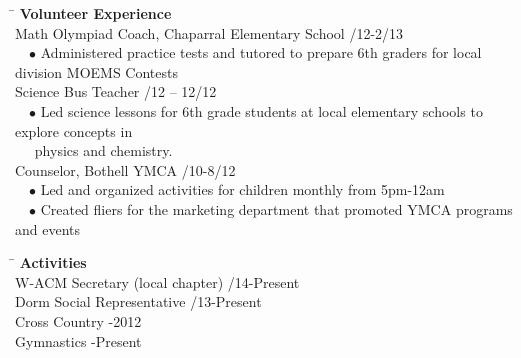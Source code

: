 \documentclass[11.5pt]{article}
\newcommand{\sectionNL}{\\[2pt]}
\newcommand{\customtab}{$\hspace{10pt}\bullet\hspace{2pt}$}
\newcommand{\customtabinline}{$\hspace{17pt}$}
\begin{document}
\begin{tabbing} 
\hspace*{6.5in}\= \kill
{\large \textbf{Volunteer Experience} } \> \sectionNL
Math Olympiad Coach, Chaparral Elementary School /12-2/13 \\
\customtab Administered practice tests and tutored to prepare 6th graders for local division MOEMS Contests \\
\newline
Science Bus Teacher /12 – 12/12 \\
\customtab Led science lessons for 6th grade students at local elementary schools to explore concepts in \\ \customtabinline physics and chemistry.  \\

Counselor, Bothell YMCA /10-8/12 \\
\customtab Led and organized activities for children monthly from 5pm-12am \\
\customtab Created fliers for the marketing department that promoted YMCA programs and events
\end{tabbing}

\begin{tabbing}
\hspace*{6.5in}\= \kill
{\large \textbf{Activities} } \> \sectionNL
W-ACM Secretary (local chapter) /14-Present \\
Dorm Social Representative /13-Present \\
Cross Country -2012 \\
Gymnastics -Present
\end{tabbing}
\end{document}
